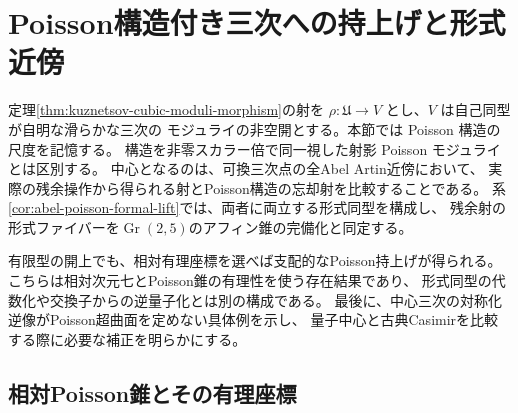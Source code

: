 \section{Poisson構造付き三次への持上げと形式近傍}
\label{sec:poisson-cubic-lifts}

定理\ref{thm:kuznetsov-cubic-moduli-morphism}の射を
$\rho:\mathfrak U\to V$ とし、$V$ は自己同型が自明な滑らかな三次の
モジュライの非空開とする。本節では Poisson 構造の尺度を記憶する。
構造を非零スカラー倍で同一視した射影 Poisson モジュライとは区別する。
中心となるのは、可換三次点の全Abel Artin近傍において、
実際の残余操作から得られる射とPoisson構造の忘却射を比較することである。
系\ref{cor:abel-poisson-formal-lift}では、両者に両立する形式同型を構成し、
残余射の形式ファイバーを$\operatorname{Gr}(2,5)$のアフィン錐の完備化と同定する。

有限型の開上でも、相対有理座標を選べば支配的なPoisson持上げが得られる。
こちらは相対次元七とPoisson錐の有理性を使う存在結果であり、
形式同型の代数化や交換子からの逆量子化とは別の構成である。
最後に、中心三次の対称化逆像がPoisson超曲面を定めない具体例を示し、
量子中心と古典Casimirを比較する際に必要な補正を明らかにする。

\subsection{相対Poisson錐とその有理座標}

